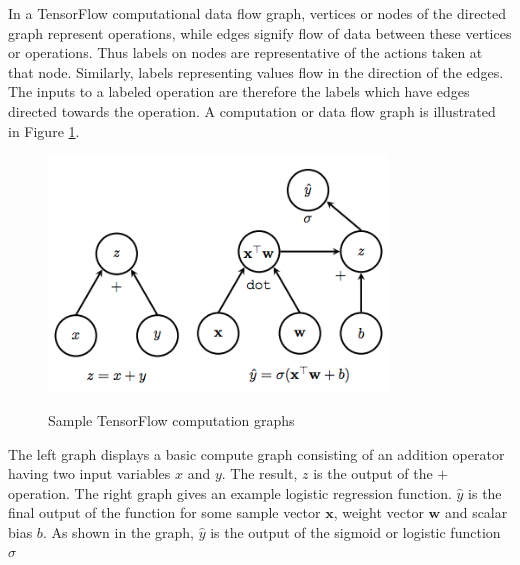 In a TensorFlow computational data flow graph, vertices or nodes of the directed graph represent operations, while edges signify flow of data between these vertices or operations. Thus labels on nodes are representative of the actions taken at that node.  Similarly, labels representing values flow in the direction of the edges. The inputs to a labeled operation are therefore the labels which have edges directed towards the operation. A computation or data flow graph is illustrated in Figure \ref{fig_c3_tfg}. 
\begin{figure}
\centering
  \includegraphics[width=9cm]{thesis/images/tfgraph}\\
  \caption{Sample TensorFlow computation graphs\citep{goldsborough2016tour}}\label{fig_c3_tfg}
\end{figure}

The left graph displays a basic compute graph consisting of an addition operator having two input variables $x$ and $y$.  The result, $z$ is the output of the $+$ operation.  The right graph gives an example logistic regression function. $\hat{y}$ is the final output of the function for some sample vector $\mathbf{x}$, weight vector $\mathbf{w}$ and scalar bias $b$.  As shown in the graph, $\hat{y}$ is the output of the sigmoid or logistic function $\sigma$

